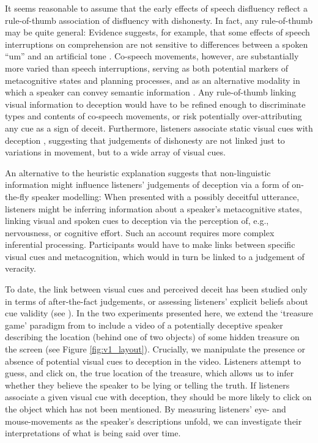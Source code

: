 \documentclass[a4paper,man,natbib]{apa6}
\newcommand*{\spex}[1]{``{#1}''} %
\begin{document}
It seems reasonable to assume that the early effects of speech disfluency reflect a rule-of-thumb association of disfluency with dishonesty.
In fact, any rule-of-thumb may be quite general:  Evidence suggests, for example, that some effects of speech interruptions on comprehension are not sensitive to differences between a spoken \spex{um} and an artificial tone \citep{Corley2011}.
Co-speech movements, however, are substantially more varied than speech interruptions, serving as both potential markers of metacognitive states and planning processes, and as an alternative modality in which a speaker can convey semantic information \citep[See, e.g.][]{Ekman1969,Mcneill1992}.
Any rule-of-thumb linking visual information to deception would have to be refined enough to discriminate types and contents of co-speech movements, or risk potentially over-attributing any cue as a sign of deceit.
Furthermore, listeners associate static visual cues with deception \citep[e.g. eye-gaze,][]{Zuckerman1981a}, suggesting that judgements of dishonesty are not linked just to variations in movement, but to a wide array of visual cues. 

An alternative to the heuristic explanation suggests that non-linguistic information might influence listeners' judgements of deception via a form of on-the-fly speaker modelling: 
When presented with a possibly deceitful utterance, listeners might be inferring information about a speaker's metacognitive states, linking visual and spoken cues to deception via the perception of, e.g., nervousness, or cognitive effort. 
Such an account requires more complex inferential processing.
Participants would have to make links between specific visual cues and metacognition, which would in turn be linked to a judgement of veracity.

To date, the link between visual cues and perceived deceit has been studied only in terms of after-the-fact judgements, or assessing listeners' explicit beliefs about cue validity (see \citealt{Vrij1996a, Zuckerman1981a}).
In the two experiments presented here, we extend the `treasure game' paradigm from \citet{Loy2017} to include a video of a potentially deceptive speaker describing the location (behind one of two objects) of some hidden treasure on the screen (see Figure \ref{fig:v1_layout}).
Crucially, we manipulate the presence or absence of potential visual cues to deception in the video.
Listeners attempt to guess, and click on, the true location of the treasure, which allows us to infer whether they believe the speaker to be lying or telling the truth.
If listeners associate a given visual cue with deception, they should be more likely to click on the object which has not been mentioned.
By measuring listeners' eye- and mouse-movements as the speaker's descriptions unfold, we can investigate their interpretations of what is being said over time.
\end{document}
